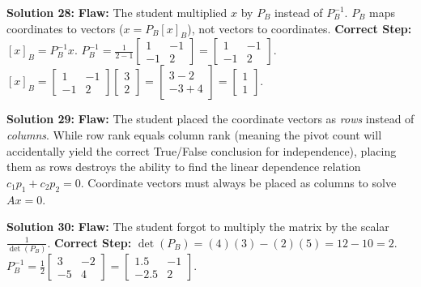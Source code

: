 \documentclass{article}
\begin{document}
\vspace{0.3cm}
\textbf{Solution 28:} \textbf{Flaw:} The student multiplied $x$ by $P_B$ instead of $P_B^{-1}$. $P_B$ maps coordinates to vectors ($x = P_B[x]_B$), not vectors to coordinates.
\textbf{Correct Step:} $[x]_B = P_B^{-1}x$.
$P_B^{-1} = \frac{1}{2-1} \begin{bmatrix} 1 & -1 \\ -1 & 2 \end{bmatrix} = \begin{bmatrix} 1 & -1 \\ -1 & 2 \end{bmatrix}$.
$[x]_B = \begin{bmatrix} 1 & -1 \\ -1 & 2 \end{bmatrix} \begin{bmatrix} 3 \\ 2 \end{bmatrix} = \begin{bmatrix} 3 - 2 \\ -3 + 4 \end{bmatrix} = \begin{bmatrix} 1 \\ 1 \end{bmatrix}$.

\vspace{0.3cm}
\textbf{Solution 29:} \textbf{Flaw:} The student placed the coordinate vectors as \textit{rows} instead of \textit{columns}. While row rank equals column rank (meaning the pivot count will accidentally yield the correct True/False conclusion for independence), placing them as rows destroys the ability to find the linear dependence relation $c_1p_1 + c_2p_2 = 0$. Coordinate vectors must always be placed as columns to solve $Ax = 0$.

\vspace{0.3cm}
\textbf{Solution 30:} \textbf{Flaw:} The student forgot to multiply the matrix by the scalar $\frac{1}{\det(P_B)}$.
\textbf{Correct Step:} $\det(P_B) = (4)(3) - (2)(5) = 12 - 10 = 2$.
$P_B^{-1} = \frac{1}{2} \begin{bmatrix} 3 & -2 \\ -5 & 4 \end{bmatrix} = \begin{bmatrix} 1.5 & -1 \\ -2.5 & 2 \end{bmatrix}$.

\newpage

\end{document}
